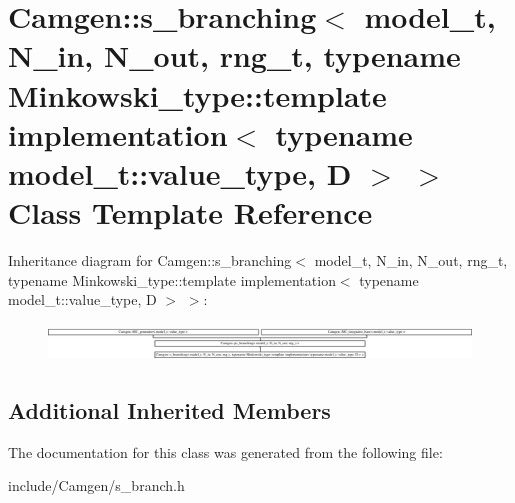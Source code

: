 \hypertarget{a00492}{}\section{Camgen\+:\+:s\+\_\+branching$<$ model\+\_\+t, N\+\_\+in, N\+\_\+out, rng\+\_\+t, typename Minkowski\+\_\+type\+:\+:template implementation$<$ typename model\+\_\+t\+:\+:value\+\_\+type, D $>$ $>$ Class Template Reference}
\label{a00492}
Inheritance diagram for Camgen\+:\+:s\+\_\+branching$<$ model\+\_\+t, N\+\_\+in, N\+\_\+out, rng\+\_\+t, typename Minkowski\+\_\+type\+:\+:template implementation$<$ typename model\+\_\+t\+:\+:value\+\_\+type, D $>$ $>$\+:\begin{figure}[H]
\begin{center}
\leavevmode
\includegraphics[height=1.009615cm]{a00492}
\end{center}
\end{figure}
\subsection*{Additional Inherited Members}


The documentation for this class was generated from the following file\+:\begin{DoxyCompactItemize}
\item 
include/\+Camgen/s\+\_\+branch.\+h\end{DoxyCompactItemize}
